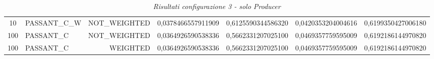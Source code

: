 \begin{table}[H]
{\begin{tabular}{ c l r c c c c }
				10 & PASSANT\_C\_W & NOT\_WEIGHTED & 0,0378466557911909 & 0,6125590344586320 & 0,0420353204004616 & 0,6199350427006180 \\
				
				100 &  PASSANT\_C & NOT\_WEIGHTED & 0,0364926590538336 & 0,5662331207025100 & 0,0469357759595009 & 0,6192186144970820 \\
				
				100 &  PASSANT\_C &   WEIGHTED & 0,0364926590538336 & 0,5662331207025100 & 0,0469357759595009 & 0,6192186144970820 \\
			\bottomrule
		\end{tabular}  
	}
	\caption{\emph{Risultati configurazione 3 - solo Producer}}
\end{table}

\setlength{\tabcolsep}{12pt}
